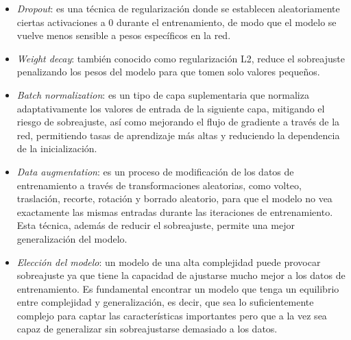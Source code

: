 \begin{itemize}
	\item \textit{Dropout}: es una técnica de regularización donde se establecen aleatoriamente ciertas activaciones a 0 durante el entrenamiento, de modo que el modelo se vuelve menos sensible a pesos específicos en la red.
	\item \textit{Weight decay}: también conocido como regularización L2, reduce el sobreajuste penalizando los pesos del modelo para que tomen solo valores pequeños.
	\item \textit{Batch normalization}: es un tipo de capa suplementaria que normaliza adaptativamente los valores de entrada de la siguiente capa, mitigando el riesgo de sobreajuste, así como mejorando el flujo de gradiente a través de la red, permitiendo tasas de aprendizaje más altas y reduciendo la dependencia de la inicialización.
	\item \textit{Data augmentation}: es un proceso de modificación de los datos de entrenamiento a través de transformaciones aleatorias, como volteo, traslación, recorte, rotación y borrado aleatorio, para que el modelo no vea exactamente las mismas entradas durante las iteraciones de entrenamiento. Esta técnica, además de reducir el sobreajuste, permite una mejor generalización del modelo.
	\item \textit{Elección del modelo}: un modelo de una alta complejidad puede provocar sobreajuste ya que tiene la capacidad de ajustarse mucho mejor a los datos de entrenamiento. Es fundamental encontrar un modelo que tenga un equilibrio entre complejidad y generalización, es decir, que sea lo suficientemente complejo para captar las características importantes pero que a la vez sea capaz de generalizar sin sobreajustarse demasiado a los datos.
\end{itemize}

